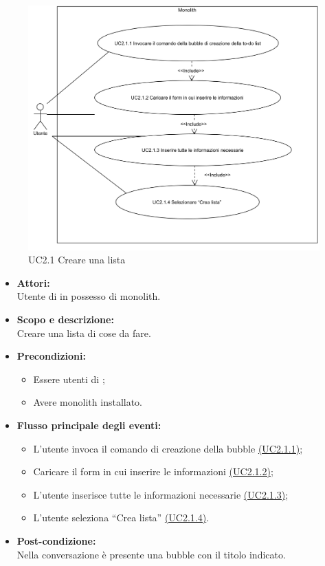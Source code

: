 \begin{figure}[H]
	\centering
	\includegraphics[width=15cm]{../../documenti/AnalisiDeiRequisiti/Diagrammi_img/uc2_1.png}
	\caption{UC2.1 Creare una lista}
\end{figure}

\begin{itemize}
	\item \textbf{Attori:}
	\\Utente di  in possesso di monolith.
	\item \textbf{Scopo e descrizione:} 
	\\Creare una lista di cose da fare.
	\item \textbf{Precondizioni:}
	\begin{itemize}
		\item Essere utenti di ;
		\item Avere monolith installato.
	\end{itemize}
	\item \textbf{Flusso principale degli eventi:}
	\begin{itemize}
		\item L’utente invoca il comando di creazione della bubble  \hyperref[UC2.1.1]{(UC2.1.1)};
		\item Caricare il form in cui inserire le informazioni \hyperref[UC2.1.2]{(UC2.1.2)};
		\item L’utente inserisce tutte le informazioni necessarie \hyperref[UC2.1.3]{(UC2.1.3)};
		\item L’utente seleziona “Crea lista” \hyperref[UC2.1.4]{(UC2.1.4)}.
	\end{itemize}
	\item \textbf{Post-condizione:}
	\\Nella conversazione è presente una bubble  con il titolo indicato.
\end{itemize}

